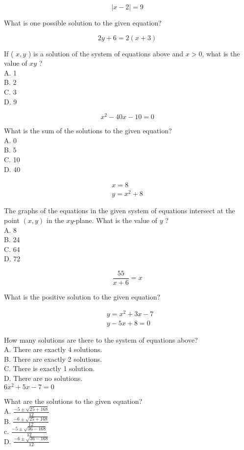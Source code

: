 $$
|x-2|=9
$$

What is one possible solution to the given equation?

$$
2 y+6=2(x+3)
$$

If ( $x, y$ ) is a solution of the system of equations above and $x>0$, what is the value of $x y$ ?\\
A. 1\\
B. 2\\
C. 3\\
D. 9

$$
x^{2}-40 x-10=0
$$

What is the sum of the solutions to the given equation?\\
A. 0\\
B. 5\\
C. 10\\
D. 40

$$
\begin{gathered}
x=8 \\
y=x^{2}+8
\end{gathered}
$$

The graphs of the equations in the given system of equations intersect at the point $(x, y)$ in the $x y$-plane. What is the value of $y$ ?\\
A. 8\\
B. 24\\
C. 64\\
D. 72

$$
\frac{55}{x+6}=x
$$

What is the positive solution to the given equation?

$$
\begin{aligned}
& y=x^{2}+3 x-7 \\
& y-5 x+8=0
\end{aligned}
$$

How many solutions are there to the system of equations above?\\
A. There are exactly 4 solutions.\\
B. There are exactly 2 solutions.\\
C. There is exactly 1 solution.\\
D. There are no solutions.\\
$6 x^{2}+5 x-7=0$

What are the solutions to the given equation?\\
A. $\frac{-5 \pm \sqrt{25+168}}{12}$\\
B. $\frac{-6 \pm \sqrt{25+168}}{12}$\\
c. $\frac{-5 \pm \sqrt{36-168}}{12}$\\
D. $\frac{-6 \pm \sqrt{36-168}}{12}$

